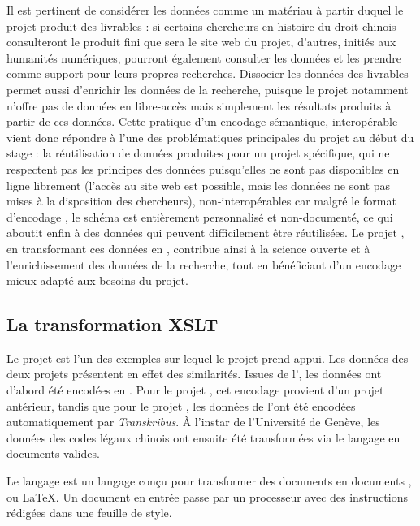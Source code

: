 Il est pertinent de considérer les données comme un matériau à partir duquel le projet produit des livrables : si certains chercheurs en histoire du droit chinois consulteront le produit fini que sera le site web du projet, d'autres, initiés aux humanités numériques, pourront également consulter les données \TEI et les prendre comme support pour leurs propres recherches. Dissocier les données des livrables permet aussi d'enrichir les données de la recherche, puisque le projet \LSC notamment n'offre pas de données en libre-accès mais simplement les résultats produits à partir de ces données. Cette pratique d'un encodage sémantique, interopérable vient donc répondre à l'une des problématiques principales du projet au début du stage : la réutilisation de données produites pour un projet spécifique, qui ne respectent pas les principes \fair des données puisqu'elles ne sont pas disponibles en ligne librement (l'accès au site web \LSC est possible, mais les données ne sont pas mises à la disposition des chercheurs), non-interopérables car malgré le format d'encodage \XML, le schéma est entièrement personnalisé et non-documenté, ce qui aboutit enfin à des données qui peuvent difficilement être réutilisées. Le projet \COREL, en transformant ces données en \TEI, contribue ainsi à la science ouverte et à l'enrichissement des données de la recherche, tout en bénéficiant d'un encodage mieux adapté aux besoins du projet. 

\subsection{La transformation XSLT}

Le projet \cordel est l'un des exemples sur lequel le projet \COREL prend appui. Les données des deux projets présentent en effet des similarités. Issues de l'\OCR, les données ont d'abord été encodées en \XML. Pour le projet \COREL, cet encodage provient d'un projet antérieur, tandis que pour le projet \cordel, les données de l'\OCR ont été encodées automatiquement par \textit{Transkribus}. À l'instar de l'Université de Genève, les données des codes légaux chinois ont ensuite été transformées via le langage \XSLT en documents \TEI valides. 

Le langage \XSLT est un langage \XML conçu pour transformer des documents \XML en documents \XML, \HTML ou \LaTeX. Un document \XML en entrée passe par un processeur \XSLT avec des instructions \XSL rédigées dans une feuille de style.

